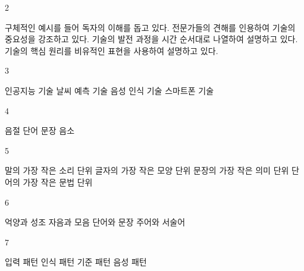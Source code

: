 \documentclass[fs9,seriesRus]{korfarm-base}
\begin{document}
\begin{kfSentenceUnit}{2}{}
\begin{kfChoices}
\kfChoice 구체적인 예시를 들어 독자의 이해를 돕고 있다.
\kfChoice 전문가들의 견해를 인용하여 기술의 중요성을 강조하고 있다.
\kfChoice 기술의 발전 과정을 시간 순서대로 나열하여 설명하고 있다.
\kfChoice 기술의 핵심 원리를 비유적인 표현을 사용하여 설명하고 있다.
\end{kfChoices}
\end{kfSentenceUnit}

\begin{kfSentenceUnit}{3}{}
\begin{kfChoices}
\kfChoice 인공지능 기술
\kfChoice 날씨 예측 기술
\kfChoice 음성 인식 기술
\kfChoice 스마트폰 기술
\end{kfChoices}
\end{kfSentenceUnit}

\begin{kfSentenceUnit}{4}{}
\begin{kfChoices}
\kfChoice 음절
\kfChoice 단어
\kfChoice 문장
\kfChoice 음소
\end{kfChoices}
\end{kfSentenceUnit}

\begin{kfSentenceUnit}{5}{}
\begin{kfChoices}
\kfChoice 말의 가장 작은 소리 단위
\kfChoice 글자의 가장 작은 모양 단위
\kfChoice 문장의 가장 작은 의미 단위
\kfChoice 단어의 가장 작은 문법 단위
\end{kfChoices}
\end{kfSentenceUnit}

\begin{kfSentenceUnit}{6}{}
\begin{kfChoices}
\kfChoice 억양과 성조
\kfChoice 자음과 모음
\kfChoice 단어와 문장
\kfChoice 주어와 서술어
\end{kfChoices}
\end{kfSentenceUnit}

\begin{kfSentenceUnit}{7}{}
\begin{kfChoices}
\kfChoice 입력 패턴
\kfChoice 인식 패턴
\kfChoice 기준 패턴
\kfChoice 음성 패턴
\end{kfChoices}
\end{kfSentenceUnit}
\end{document}

